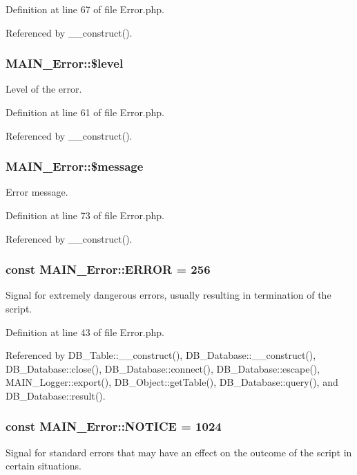 Definition at line 67 of file Error.php.

Referenced by \_\-\_\-construct().\hypertarget{classMAIN__Error_acddcbb7c1ce7ac137b542542282ec4bc}{
\subsubsection[{\$level}]{\setlength{\rightskip}{0pt plus 5cm}MAIN\_\-Error::\$level}}
\label{d4/d5e/classMAIN__Error_acddcbb7c1ce7ac137b542542282ec4bc}
Level of the error. 

Definition at line 61 of file Error.php.

Referenced by \_\-\_\-construct().\hypertarget{classMAIN__Error_a7210e16c421fd1a44fa947273bff58b5}{
\subsubsection[{\$message}]{\setlength{\rightskip}{0pt plus 5cm}MAIN\_\-Error::\$message}}
\label{d4/d5e/classMAIN__Error_a7210e16c421fd1a44fa947273bff58b5}
Error message. 

Definition at line 73 of file Error.php.

Referenced by \_\-\_\-construct().\hypertarget{classMAIN__Error_a8dd94ca1db9a48b21bad30ed114e7fbe}{
\subsubsection[{ERROR}]{\setlength{\rightskip}{0pt plus 5cm}const {\bf MAIN\_\-Error::ERROR} = 256}}
\label{d4/d5e/classMAIN__Error_a8dd94ca1db9a48b21bad30ed114e7fbe}
Signal for extremely dangerous errors, usually resulting in termination of the script. 

Definition at line 43 of file Error.php.

Referenced by DB\_\-Table::\_\-\_\-construct(), DB\_\-Database::\_\-\_\-construct(), DB\_\-Database::close(), DB\_\-Database::connect(), DB\_\-Database::escape(), MAIN\_\-Logger::export(), DB\_\-Object::getTable(), DB\_\-Database::query(), and DB\_\-Database::result().\hypertarget{classMAIN__Error_a6566891abdf29792892d9cf42fcc496d}{
\subsubsection[{NOTICE}]{\setlength{\rightskip}{0pt plus 5cm}const {\bf MAIN\_\-Error::NOTICE} = 1024}}
\label{d4/d5e/classMAIN__Error_a6566891abdf29792892d9cf42fcc496d}
Signal for standard errors that may have an effect on the outcome of the script in certain situations. 

